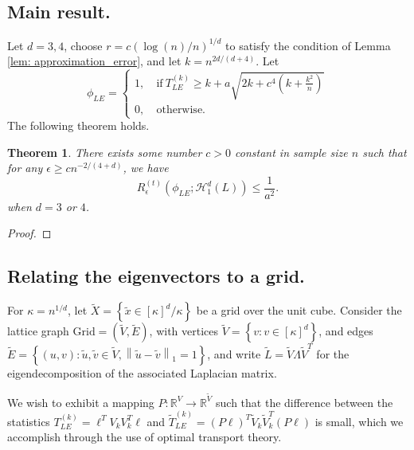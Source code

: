 \documentclass{article}
\newcommand{\Reals}{\mathbb{R}}
\newcommand{\norm}[1]{\left\lVert#1\right\rVert}
\newcommand{\set}[1]{\left\{#1\right\}}
\newcommand{\1}{\mathbb{I}}
\newcommand{\Hclass}{\mathcal{H}}
\newcommand{\wt}[1]{\widetilde{#1}}
\theoremstyle{alden}
\theoremstyle{aldenthm}
\newtheorem{theorem}{Theorem}
\theoremstyle{definition}
\theoremstyle{remark}
\begin{document}
\subsection{Main result.}
Let $d = 3,4$, choose $r = c(\log(n)/n)^{1/d}$ to satisfy the condition of Lemma \ref{lem: approximation_error}, and let $k = n^{2d/(d + 4)}$. Let 
\begin{equation*}
\phi_{LE} =
\begin{cases}
1,~ & \text{if}~ T_{LE}^{(k)} \geq k + a\sqrt{2k + c^4\left(k + \frac{k^2}{n}\right)} \\
0,~ & \text{otherwise}.
\end{cases}
\end{equation*}
The following theorem holds.
\begin{theorem}
	There exists some number $c > 0$ constant in sample size $n$ such that for any $\epsilon \geq c n^{-2/(4 + d)}$, we have
	\begin{equation*}
	R_{\epsilon}^{(t)}(\phi_{LE}; \Hclass_1^{d}(L)) \leq \frac{1}{a^2}.
	\end{equation*}
	when $d = 3$ or $4$. 
\end{theorem}
\begin{proof}
	
\end{proof}

\subsection{Relating the eigenvectors to a grid.}

For $\kappa = n^{1/d}$, let $\widetilde{X} = \set{\wt{x} \in [\kappa]^d/\kappa}$ be a grid over the unit cube. Consider the lattice graph $\mathrm{Grid} = (\widetilde{V}, \widetilde{E})$, with vertices $\widetilde{V} = \set{v: v \in [\kappa]^d}$, and edges $\widetilde{E} = \set{(u,v):\widetilde{u}, \wt{v} \in \wt{V}, \norm{\wt{u} - \wt{v}}_1 = 1}$, and write $\widetilde{L} = \widetilde{V} \Lambda \wt{V}^T$ for the eigendecomposition of the associated Laplacian matrix.

We wish to exhibit a mapping $P: \Reals^V \to \Reals^{\wt{V}}$ such that the difference between the statistics $T_{LE}^{(k)} = \ell^T V_k V_k^T \ell$ and $\wt{T}_{LE}^{(k)} = (P \ell)^T \wt{V}_k \wt{V}_k^T (P \ell)$ is small, which we accomplish through the use of optimal transport theory.
\end{document}
